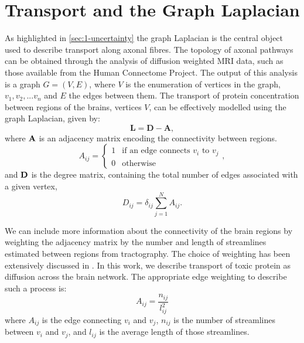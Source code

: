 \section{Transport and the Graph Laplacian}
\label{sec:transport}
As highlighted in \cref{sec:1-uncertainty} the graph Laplacian is the central
object used to describe transport along axonal fibres. The topology of axonal
pathways can be obtained through the analysis of diffusion weighted MRI data,
such as those available from the Human Connectome Project. The output of
this analysis is a graph $G = (V, E)$, where $V$ is the enumeration of vertices
in the graph, $v_1, v_2, . . . v_n$ and $E$ the edges between them. The
transport of protein concentration between regions of the brains, vertices $V$,
can be effectively modelled using the graph Laplacian, given by:
\begin{equation}\label{eqn:laplacian_matrix}
    \mathbf{L} = \mathbf{D} - \mathbf{A},
\end{equation}
where $\mathbf{A}$ is an adjacency matrix encoding the connectivity between 
regions.
\begin{equation}\label{eqn:adjacency_matrix}
A_{ij} = \left\{\begin{array}{cl} 1 & \text{if an edge connects } v_i \text{ to } v_j\\ 0 
                            & \text{otherwise}\end{array}\right.,
\end{equation}
and $\mathbf{D}$ is the degree matrix, containing the total number of edges associated with a given vertex, 
\begin{equation}\label{eqn:degree_matrix}
D_{ij} = \delta_{ij} \sum_{j=1}^{N} A_{ij}.
\end{equation}

We can include more information about the connectivity of the brain regions by
weighting the adjacency matrix by the number and length of streamlines estimated
between regions from tractography. The choice of weighting has been extensively
discussed in \cite{putra2021braiding}. In this work, we describe transport of
toxic protein as diffusion across the brain network. The appropriate edge
weighting to describe such a process is: 
\begin{equation}
    \label{eqn:edge-weighting}
    A_{ij} = \frac{n_{ij}}{l_{ij}^{2}}
\end{equation}
where $A_{ij}$ is the edge connecting $v_i$ and $v_j$, $n_{ij}$ is the number of 
streamlines between $v_i$ and $v_j$, and $l_{ij}$ is the average length of those 
streamlines.

